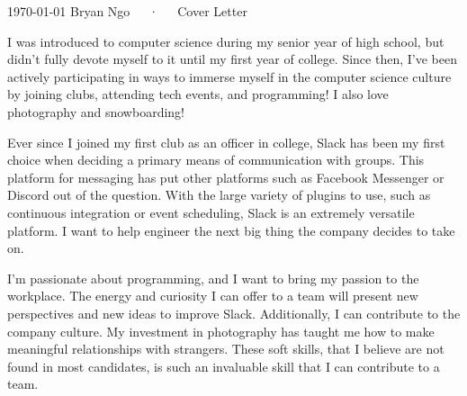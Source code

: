 \documentclass[11pt, a4paper]{awesome-cv}
\begin{document}
\makecvheader[R]

\makecvfooter
  {\today}
  {Bryan Ngo~~~·~~~Cover Letter}
  {}

\makelettertitle

\begin{cvletter}

I was introduced to computer science during my senior year of high school, but didn't fully devote myself to it until my first year of college. Since then, I've been actively participating in ways to immerse myself in the computer science culture by joining clubs, attending tech events, and programming! I also love photography and snowboarding!

Ever since I joined my first club as an officer in college, Slack has been my first choice when deciding a primary means of communication with groups. This platform for messaging has put other platforms such as Facebook Messenger or Discord out of the question. With the large variety of plugins to use, such as continuous integration or event scheduling, Slack is an extremely versatile platform. I want to help engineer the next big thing the company decides to take on.

I'm passionate about programming, and I want to bring my passion to the workplace. The energy and curiosity I can offer to a team will present new perspectives and new ideas to improve Slack. Additionally, I can contribute to the company culture. My investment in photography has taught me how to make meaningful relationships with strangers. These soft skills, that I believe are not found in most candidates, is such an invaluable skill that I can contribute to a team.

\end{cvletter}


\makeletterclosing
\end{document}
